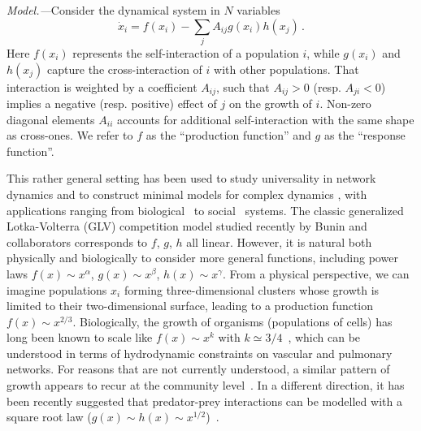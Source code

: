 \emph{Model.---}Consider the dynamical system in $N$ variables
\begin{equation}\label{dynamics}
    \dot{x}_i = f(x_i) - \sum_{j}A_{ij}g(x_i)h(x_j) \, .
\end{equation}
Here $f(x_i)$ represents the self-interaction of a population $i$, while $g(x_i)$ and $h(x_j)$ capture the cross-interaction of $i$ with other populations. That interaction is weighted by a coefficient $A_{ij}$, such that $A_{ij} > 0$ (resp.
$A_{ji} < 0$) implies a negative (resp.
positive) effect of $j$ on the growth of $i$. Non-zero diagonal elements $A_{ii}$ accounts for additional self-interaction with the same shape as cross-ones. 
We refer to $f$ as the ``production function'' and $g$ as the ``response function''.

This rather general setting has been used to study universality in network dynamics \cite{Barzel2013} and to construct minimal models for complex dynamics \cite{Barzel2015}, with applications ranging from biological~\cite{Alon2006,Karlebach2008} 
to social~\cite{Pastor-Satorras2001,Hufnagel2004,Dodds2005} systems.
The classic generalized Lotka-Volterra (GLV) competition model studied recently by Bunin and collaborators \cite{bunin2017ecological, biroli2018marginally} corresponds to $f$, $g$, $h$ all linear. 
However, it is natural both physically and biologically to consider more general functions, including power laws $f(x)\sim x^\alpha$, $g(x)\sim x^\beta$, $h(x) \sim x^\gamma$.
From a physical perspective, we can imagine populations $x_i$ forming three-dimensional clusters whose growth is limited to their two-dimensional surface, leading to a production function $f(x) \sim x^{2/3}$.
Biologically, the growth of organisms (populations of cells) has long been known to scale like $f(x) \sim x^k$ with $k\simeq 3/4$~\cite{Brown2004}, which can be understood in terms of hydrodynamic constraints on vascular and pulmonary networks.
For reasons that are not currently understood, a similar pattern of growth appears to recur at the community level~\cite{Hatton2015,Hatton2023}.
In a different direction, it has been recently suggested that predator-prey interactions can be modelled with a square root law ($g(x) \sim h(x) \sim x^{1/2}$)~\cite{Barbier2021,Mazzarisi2023}.
